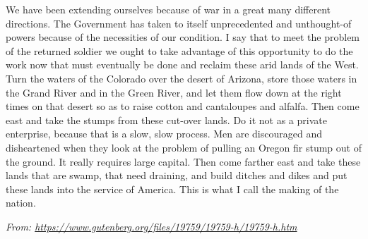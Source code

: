\begin{linenumbers*}
\indent We have been extending ourselves because of war in a great many different directions. The Government has taken to itself unprecedented and unthought-of powers because of the necessities of our condition. I say that to meet the problem of the returned soldier we ought to take advantage of this opportunity to do the work now that must eventually be done and reclaim these arid lands of the West. Turn the waters of the Colorado over the desert of Arizona, store those waters in the Grand River and in the Green River, and let them flow down at the right times on that desert so as to raise cotton and cantaloupes and alfalfa. Then come east and take the stumps from these cut-over lands. Do it not as a private enterprise, because that is a slow, slow process. Men are discouraged and disheartened when they look at the problem of pulling an Oregon fir stump out of the ground. It really requires large capital. Then come farther east and take these lands that are swamp, that need draining, and build ditches and dikes and put these lands into the service of America. This is what I call the making of the nation.
\end{linenumbers*}

\textit{From: \url{https://www.gutenberg.org/files/19759/19759-h/19759-h.htm}}

